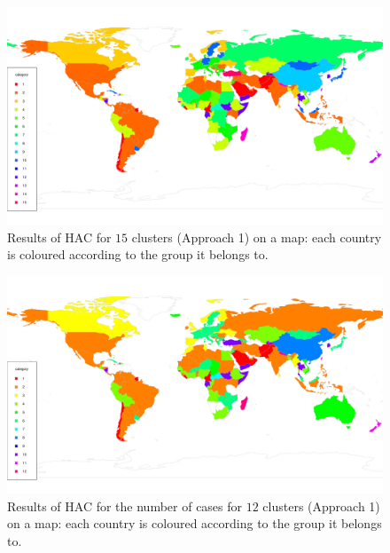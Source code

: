 \documentclass[a4paper,12pt]{article}
\numberwithin{equation}{section}
\begin{document}
\begin{figure}[t!]
\begin{minipage}[t]{0.98\textwidth}
\includegraphics[width=\textwidth]{plots/14days/map_15cl}
\caption{Results of HAC for $15$ clusters (Approach 1) on a map: each country is coloured according to the group it belongs to.}\label{fig:map_15cl}
\end{minipage}
\end{figure}

\newpage 
\FloatBarrier
\begin{figure}[t!]
\begin{minipage}[t]{0.98\textwidth}
\includegraphics[width=\textwidth]{plots/14days/map_12cl}
\caption{Results of HAC for the number of cases for $12$ clusters (Approach 1) on a map: each country is coloured according to the group it belongs to.}\label{fig:map_12cl}
\end{minipage}
\end{figure}
\end{document}
